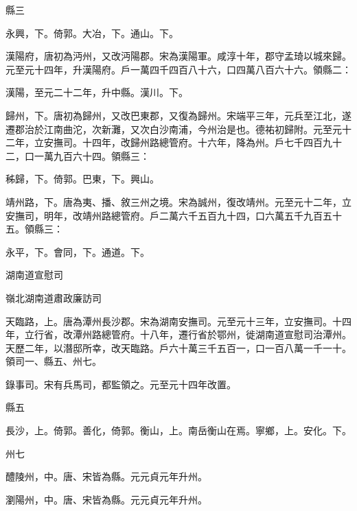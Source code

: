 \begin{pinyinscope}
 縣三



 永興，下。倚郭。大冶，下。通山。下。



 漢陽府，唐初為沔州，又改沔陽郡。宋為漢陽軍。咸淳十年，郡守孟琦以城來歸。元至元十四年，升漢陽府。戶一萬四千四百八十六，口四萬八百六十六。領縣二：



 漢陽，至元二十二年，升中縣。漢川。下。



 歸州，下。唐初為歸州，又改巴東郡，又復為歸州。宋端平三年，元兵至江北，遂遷郡治於江南曲沱，次新灘，又次白沙南浦，今州治是也。德祐初歸附。元至元十二年，立安撫司。十四年，改歸州路總管府。十六年，降為州。戶七千四百九十二，口一萬九百六十四。領縣三：



 秭歸，下。倚郭。巴東，下。興山。



 靖州路，下。唐為夷、播、敘三州之境。宋為誠州，復改靖州。元至元十二年，立安撫司，明年，改靖州路總管府。戶二萬六千五百九十四，口六萬五千九百五十五。領縣三：



 永平，下。會同，下。通道。下。



 湖南道宣慰司



 嶺北湖南道肅政廉訪司



 天臨路，上。唐為潭州長沙郡。宋為湖南安撫司。元至元十三年，立安撫司。十四年，立行省，改潭州路總管府。十八年，遷行省於鄂州，徙湖南道宣慰司治潭州。天歷二年，以潛邸所幸，改天臨路。戶六十萬三千五百一，口一百八萬一千一十。領司一、縣五、州七。



 錄事司。宋有兵馬司，都監領之。元至元十四年改置。



 縣五



 長沙，上。倚郭。善化，倚郭。衡山，上。南岳衡山在焉。寧鄉，上。安化。下。



 州七



 醴陵州，中。唐、宋皆為縣。元元貞元年升州。



 瀏陽州，中。唐、宋皆為縣。元元貞元年升州。




\end{pinyinscope}
